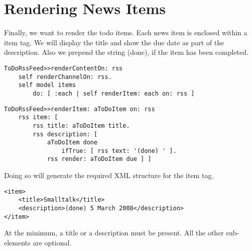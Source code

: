 \documentclass[a4paper,10pt,twoside]{book}
\newcommand{\ct}[1]{{\small\ttfamily\textup{#1}}}
\begin{document}
\section{Rendering News Items}
\label{book:web20:rss:newsdefinition}

Finally, we want to render the todo items. Each news item is enclosed within a \ct{item} tag. We will display the title and show the due date as part of the description. Also we prepend the string \ct{(done)}, if the item has been completed.

\begin{lstlisting}
ToDoRssFeed>>renderContentOn: rss
    self renderChannelOn: rss.
    self model items
        do: [ :each | self renderItem: each on: rss ]
\end{lstlisting}

\begin{lstlisting}
ToDoRssFeed>>renderItem: aToDoItem on: rss
    rss item: [
        rss title: aToDoItem title.
        rss description: [
            aToDoItem done
                ifTrue: [ rss text: '(done) ' ].
            rss render: aToDoItem due ] ]
\end{lstlisting}

Doing so will generate the required XML structure for the item tag.

\begin{lstlisting}
<item>
    <title>Smalltalk</title>
    <description>(done) 5 March 2008</description>
</item>
\end{lstlisting}

At the minimum, a title or a description must be present. All the other sub-elements are optional. 
\end{document}
